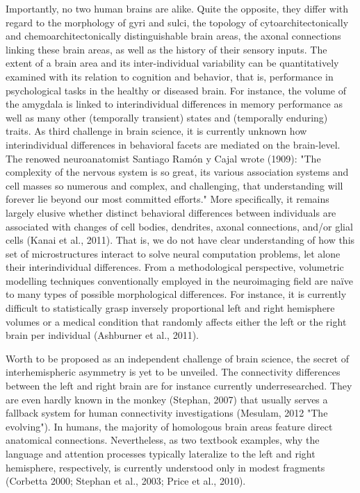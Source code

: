 \documentclass[authoryear,review,3p]{elsarticle}
\begin{document}
Importantly,
no two human brains are alike.
Quite the opposite,
they differ with regard to
the morphology of gyri and sulci,
the topology of cytoarchitectonically and chemoarchitectonically
distinguishable brain areas,
the axonal connections linking these brain areas,
as well as the history of their sensory inputs.
%
The extent of a brain area and its inter-individual variability
can be quantitatively examined with its relation to cognition and behavior,
that is,
performance in psychological tasks in the healthy or diseased brain.
For instance, the volume of the amygdala is linked to
interindividual differences in memory performance as well as
many other (temporally transient) states and
(temporally enduring) traits.
%
As third challenge in brain science,
it is currently unknown how interindividual differences
in behavioral facets are mediated on the brain-level.
%
The renowed neuroanatomist Santiago Ram\'{o}n y Cajal wrote (1909):
"The complexity of the nervous system is so great,
its various association systems and cell masses so numerous and
complex, and challenging,
that understanding will forever lie beyond our most committed efforts."
%
More specifically, it remains largely elusive
whether distinct behavioral differences
between individuals are associated with changes of
cell bodies, dendrites, axonal connections, and/or glial cells
(Kanai et al., 2011).
That is,
we do not have clear understanding of how
this set of microstructures interact to
solve neural computation problems,
let alone their interindividual differences.
%
From a methodological perspective,
volumetric modelling techniques
conventionally employed in the neuroimaging field
are na\"ive to
many types of possible morphological differences.
For instance,
it is currently difficult to statistically grasp
inversely proportional left and right hemisphere volumes
or
a medical condition that randomly
affects either the left or the right brain
per individual
(Ashburner et al., 2011).


Worth to be proposed as an independent challenge of
brain science, the secret of interhemispheric
asymmetry is yet to be unveiled.
The connectivity differences between the left and right brain are
for instance currently underresearched.
They are even hardly known in the monkey (Stephan, 2007)
that usually serves a fallback system for human
connectivity investigations (Mesulam, 2012 "The evolving").
In humans, the majority of homologous brain areas feature
direct anatomical connections.
Nevertheless, as two textbook examples,
why the language and attention processes typically lateralize to
the left and right hemisphere, respectively,
is currently understood only in modest fragments
(Corbetta 2000; Stephan et al., 2003; Price et al., 2010).
\end{document}
